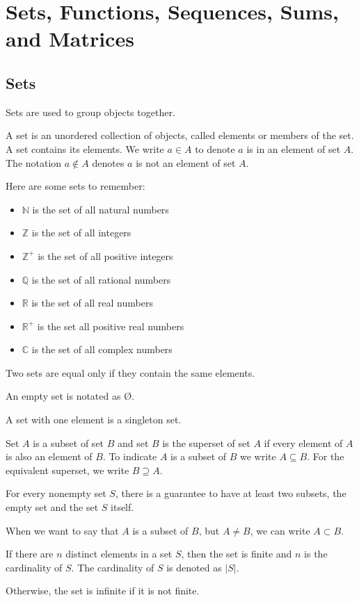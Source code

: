 \documentclass[../discrete.tex]{subfiles}
\begin{document}
\chapter{Sets, Functions, Sequences, Sums, and Matrices}
\section{Sets}
Sets are used to group objects together. 

A set is an unordered collection of objects, called elements or members of the set. A set contains its elements. We write $a \in A$ to denote $a$ is in an element of set $A$. The notation $a\notin A$ denotes $a$ is not an element of set $A$.

Here are some sets to remember:
\begin{itemize}
    \item $\mathbb N$ is the set of all natural numbers
    \item $\mathbb Z$ is the set of all integers
    \item $\mathbb Z^+$ is the set of all positive integers
    \item $\mathbb Q$ is the set of all rational numbers
    \item $\mathbb R$ is the set of all real numbers
    \item $\mathbb R^+$ is the set all positive real numbers
    \item $\mathbb C$ is the set of all complex numbers
\end{itemize}
Two sets are equal only if they contain the same elements.

An empty set is notated as \O.

A set with one element is a singleton set.

Set $A$ is a subset of set $B$ and set $B$ is the superset of set $A$ if every element of $A$ is also an element of $B$. To indicate $A$ is a subset of $B$ we write $A\subseteq B$. For the equivalent superset, we write $B\supseteq A$.

For every nonempty set $S$, there is a guarantee to have at least two subsets, the empty set and the set $S$ itself. 

When we want to say that $A$ is a subset of $B$, but $A\neq B$, we can write $A\subset B$. 

If there are $n$ distinct elements in a set $S$, then the set is finite and $n$ is the cardinality of $S$. The cardinality of $S$ is denoted as $|S|$.

Otherwise, the set is infinite if it is not finite.
\end{document}
